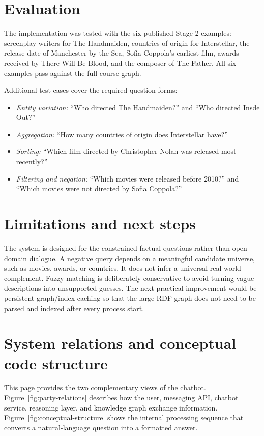 \documentclass[10pt,a4paper]{article}
\begin{document}
\section{Evaluation}
The implementation was tested with the six published Stage 2 examples: screenplay writers for The Handmaiden, countries of origin for Interstellar, the release date of Manchester by the Sea, Sofia Coppola's earliest film, awards received by There Will Be Blood, and the composer of The Father. All six examples pass against the full course graph.

Additional test cases cover the required question forms:
\begin{itemize}
    \item \emph{Entity variation:} ``Who directed The Handmaiden?'' and ``Who directed Insde Out?''
    \item \emph{Aggregation:} ``How many countries of origin does Interstellar have?''
    \item \emph{Sorting:} ``Which film directed by Christopher Nolan was released most recently?''
    \item \emph{Filtering and negation:} ``Which movies were released before 2010?'' and ``Which movies were not directed by Sofia Coppola?''
\end{itemize}

\section{Limitations and next steps}
The system is designed for the constrained factual questions rather than open-domain dialogue. A negative query depends on a meaningful candidate universe, such as movies, awards, or countries. It does not infer a universal real-world complement. Fuzzy matching is deliberately conservative to avoid turning vague descriptions into unsupported guesses. The next practical improvement would be persistent graph/index caching so that the large RDF graph does not need to be parsed and indexed after every process start.

\clearpage
\section*{System relations and conceptual code structure}
This page provides the two complementary views of the chatbot. Figure~\ref{fig:party-relations} describes how the user, messaging API, chatbot service, reasoning layer, and knowledge graph exchange information. Figure~\ref{fig:conceptual-structure} shows the internal processing sequence that converts a natural-language question into a formatted answer.
\end{document}
